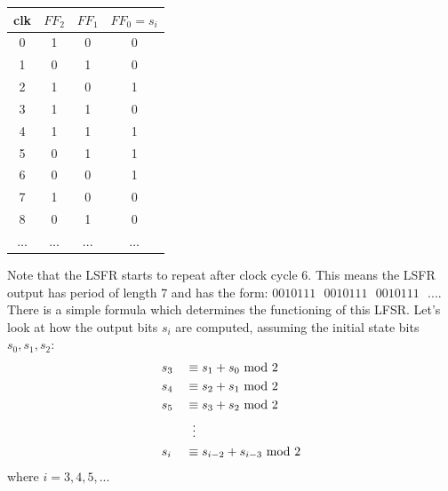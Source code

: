 \documentclass[11pt, a4paper]{article}
\newcommand{\mymod}{
    \text{ mod }
}
\begin{document}
\begin{center}
    \begin{tabular}{|c|c|c|c|}
         \hline
         clk&$FF_2$&$FF_1$&$FF_0=s_i$\\
         \hline
         0&1&0&0\\
         1&0&1&0\\
         2&1&0&1\\
         3&1&1&0\\
         4&1&1&1\\
         5&0&1&1\\
         6&0&0&1\\
         7&1&0&0\\
         8&0&1&0\\
         ...&...&...&...\\
         \hline
    \end{tabular}
\end{center}
Note that the LSFR starts to repeat after clock cycle 6. This means the LSFR output has period of length 7 and has the form: $0010111\text{ }0010111\text{ }0010111\text{ }...$. There is a simple formula which determines the functioning of this LFSR. Let's look at how the output bits $s_i$ are computed, assuming the initial state bits $s_0,s_1,s_2$:
\begin{alignat*}{2}
    &s_3&&\equiv s_1+s_0\mymod2\\
    &s_4&&\equiv s_2+s_1\mymod2\\
    &s_5&&\equiv s_3+s_2\mymod2\\
    &   &&\hspace{0.2cm}\vdots\\
    &s_{i}&&\equiv s_{i-2}+s_{i-3}\mymod2
\end{alignat*}
where $i=3,4,5,...$

\newpage
\end{document}
